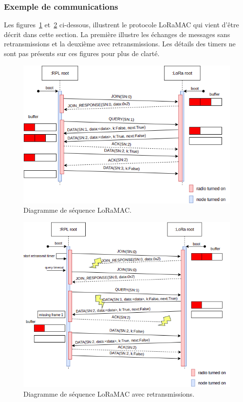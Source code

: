 \subsubsection*{Exemple de communications}
    Les figures~\ref{fig:archi-sequence1} et~\ref{fig:archi-sequence2} ci-dessous, illustrent le protocole LoRaMAC qui vient d'être décrit dans cette section. La première illustre les échanges de messages sans retransmissions et la deuxième avec retransmissions. Les détails des timers ne sont pas présents sur ces figures pour plus de clarté.
    \begin{figure}[H]
        \centering
        \includegraphics[scale=0.6]{res/pictures/loramac-sequence1.drawio.png}
        \caption{Diagramme de séquence LoRaMAC.}
        \label{fig:archi-sequence1}
    \end{figure}
    \begin{figure}[H]
        \centering
        \includegraphics[scale=0.6]{res/pictures/loramac-sequence2.drawio.png}
        \caption{Diagramme de séquence LoRaMAC avec retransmissions.}
        \label{fig:archi-sequence2}
    \end{figure}

